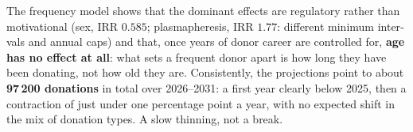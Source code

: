 \begin{otherlanguage}{english}
The frequency model shows that the dominant effects are regulatory rather than
motivational (sex, IRR $0.585$; plasmapheresis, IRR $1.77$: different minimum
intervals and annual caps) and that, once years of donor career are controlled
for, \textbf{age has no effect at all}: what sets a frequent donor apart is how
long they have been donating, not how old they are. Consistently, the
projections point to about \textbf{97\,200 donations} in total over 2026--2031: a first
year clearly below 2025, then a contraction of just under one percentage point
a year, with no expected shift in the mix of donation types. A slow thinning,
not a break.

\end{otherlanguage}
